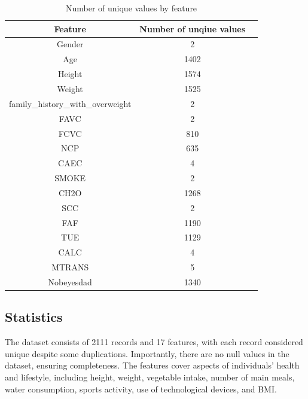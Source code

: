 \documentclass[11pt, a4paper]{article}
\begin{document}
\begin{table}[H]
    \centering
    \begin{tabular}{|c|c|c|}
        \hline
        \textbf{Feature} & \textbf{Number of unqiue values} \\ \hline
        Gender & 2 \\ \hline
        Age & 1402 \\ \hline
        Height & 1574 \\ \hline
        Weight & 1525 \\ \hline
        family\_history\_with\_overweight & 2 \\ \hline
        FAVC & 2 \\ \hline
        FCVC & 810 \\ \hline
        NCP & 635 \\ \hline
        CAEC & 4 \\ \hline
        SMOKE & 2 \\ \hline
        CH2O & 1268 \\ \hline
        SCC & 2 \\ \hline
        FAF & 1190 \\ \hline
        TUE & 1129 \\ \hline
        CALC & 4 \\ \hline
        MTRANS & 5 \\ \hline
        Nobeyesdad & 1340 \\ \hline
    \end{tabular}
    \caption{Number of unique values by feature}
    \label{tab:table_unique_values}
\end{table}

\subsection{Statistics}

The dataset consists of 2111 records and 17 features, with each record considered unique despite some duplications. 
Importantly, there are no null values in the dataset, ensuring completeness. The features cover aspects of individuals' health and lifestyle, 
including height, weight, vegetable intake, number of main meals, water consumption, sports activity, use of technological devices, and BMI.
\end{document}

